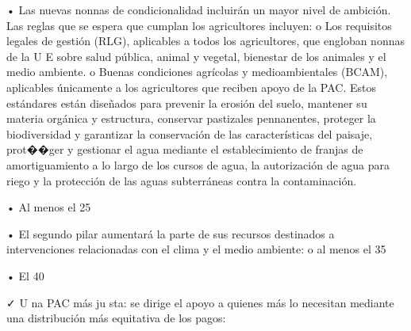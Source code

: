 \documentclass[10pt,a4paper]{article}
\begin{document}
• Las nuevas nonnas de condicionalidad incluirán un mayor nivel de ambición. Las reglas que se espera que cumplan los agricultores incluyen: o Los requisitos legales de gestión (RLG), aplicables a todos los agricultores, que engloban nonnas de la U E sobre salud pública, animal y vegetal, bienestar de los animales y el medio ambiente. o Buenas condiciones agrícolas y medioambientales (BCAM), aplicables únicamente a los agricultores que reciben apoyo de la PAC. Estos estándares están diseñados para prevenir la erosión del suelo, mantener su materia orgánica y estructura, conservar pastizales pennanentes, proteger la biodiversidad y garantizar la conservación de las características del paisaje, prot��ger y gestionar el agua mediante el establecimiento de franjas de amortiguamiento a lo largo de los cursos de agua, la autorización de agua para riego y la protección de las aguas subterráneas contra la contaminación.

• Al menos el 25 %

• El segundo pilar aumentará la parte de sus recursos destinados a intervenciones relacionadas con el clima y el medio ambiente: o al menos el 35 %

• El 40 %

✓ U na PAC más ju sta: se dirige el apoyo a quienes más lo necesitan mediante una distribución más equitativa de los pagos:
\end{document}
